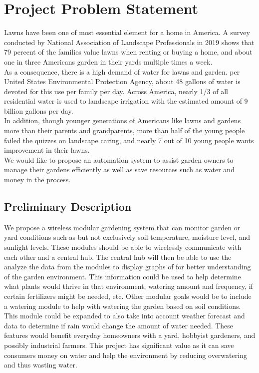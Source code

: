 \chapter{Project Problem Statement}
	Lawns have been one of most essential element for a home in America. A survey conducted by National Association of Landscape Professionals in 2019 shows that 79 percent of the families value lawns when renting or buying a home, and about one in three Americans garden in their yards multiple times a week\cite{noauthor_new_2019}. \\
	
	As a consequence, there is a high demand of water for lawns and garden. per United States Environmental Protection Agency, about 48 gallons of water is devoted for this use per family per day. Across America, nearly 1/3 of all residential water is used to landscape irrigation with the estimated amount of 9 billion gallons per day\cite{epa_outdoor_nodate}. \\
	
	In addition, though younger generations of Americans like lawns and gardens more than their parents and grandparents, more than half of the young people failed the quizzes on landscape caring, and nearly 7 out of 10 young people wants improvement in their lawns\cite{noauthor_new_2016}. \\
	
	We would like to propose an automation system to assist garden owners to manage their gardens efficiently as well as save resources such as water and money in the process. 
\section{Preliminary Description}
	We propose a wireless modular gardening system that can monitor garden or yard conditions such as but not exclusively soil temperature, moisture level, and sunlight levels. These modules should be able to wirelessly communicate with each other and a central hub. The central hub will then be able to use the analyze the data from the modules to display graphs of for better understanding of the garden environment. This information could be used to help determine what plants would thrive in that environment, watering amount and frequency, if certain fertilizers might be needed, etc. Other modular goals would be to include a watering module to help with watering the garden based on soil conditions. This module could be expanded to also take into account weather forecast and data to determine if rain would change the amount of water needed. These features would benefit everyday homeowners with a yard, hobbyist gardeners, and possibly industrial farmers. This project has significant value as it can save consumers money on water and help the environment by reducing overwatering and thus wasting water. 
	
